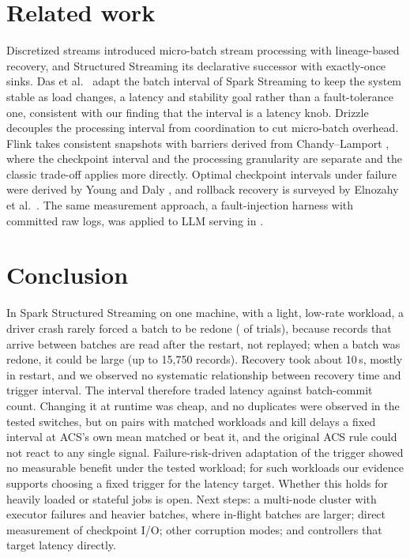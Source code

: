 \documentclass[10pt,twocolumn]{article}
\begin{document}
\section{Related work}

Discretized streams \cite{zaharia2013discretized} introduced micro-batch stream
processing with lineage-based recovery, and Structured Streaming
\cite{armbrust2018structured} its declarative successor with exactly-once sinks.
Das et al.\ \cite{das2014adaptive} adapt the batch interval of Spark Streaming
to keep the system stable as load changes, a latency and stability goal rather
than a fault-tolerance one, consistent with our finding that the interval is a
latency knob. Drizzle \cite{venkataraman2017drizzle} decouples the processing
interval from coordination to cut micro-batch overhead. Flink takes consistent
snapshots with barriers derived from Chandy--Lamport
\cite{chandy1985snapshots,carbone2015lightweight,carbone2017state}, where the
checkpoint interval and the processing granularity are separate and the classic
trade-off applies more directly. Optimal checkpoint intervals under failure
were derived by Young \cite{young1974first} and Daly \cite{daly2006higher}, and
rollback recovery is surveyed by Elnozahy et al.\ \cite{elnozahy2002survey}.
The same measurement approach, a fault-injection harness with committed raw
logs, was applied to LLM serving in \cite{medipally2026llm}.

\section{Conclusion}

In Spark Structured Streaming on one machine, with a light, low-rate
workload, a driver crash rarely forced a batch to be redone (\ReplayEvents{} of
\CleanTrials{} trials), because records that arrive between batches are read
after the restart, not replayed; when a batch was redone, it could be large
(up to 15{,}750 records). Recovery took about 10\,s, mostly in restart, and we
observed no systematic relationship between recovery time and trigger interval. The interval therefore traded latency against
batch-commit count. Changing it at runtime was cheap, and no duplicates were
observed in the tested switches, but on pairs with matched workloads and kill
delays a fixed
interval at ACS's own mean matched or beat it, and the original ACS rule could
not react to any single signal. Failure-risk-driven adaptation of the trigger
showed no measurable benefit under the tested workload; for such workloads our
evidence supports choosing a fixed trigger for the latency target. Whether this
holds for heavily loaded or stateful jobs is open. Next steps: a multi-node
cluster with executor failures and heavier batches, where in-flight batches are
larger; direct measurement of checkpoint I/O; other corruption modes; and
controllers that target latency directly.
\end{document}

